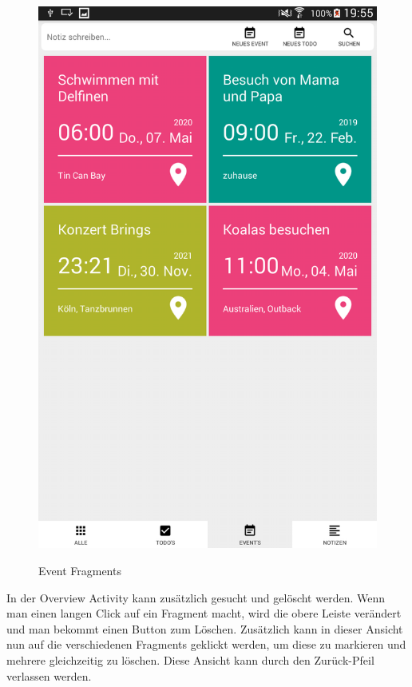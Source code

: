 \begin{figure}[H]
\centering
\begin{minipage}[t]{1\textwidth} %
\caption{Event Fragments} %
\includegraphics[width=1\textwidth]{img/FragmentE}\\ %
\end{minipage}
\end{figure}

In der Overview Activity kann zusätzlich gesucht und gelöscht werden. Wenn man einen langen Click auf ein Fragment macht, wird die obere Leiste verändert und man bekommt einen Button zum Löschen. Zusätzlich kann in dieser Ansicht nun auf die verschiedenen Fragments geklickt werden, um diese zu markieren und mehrere gleichzeitig zu löschen. Diese Ansicht kann durch den Zurück-Pfeil verlassen werden.

